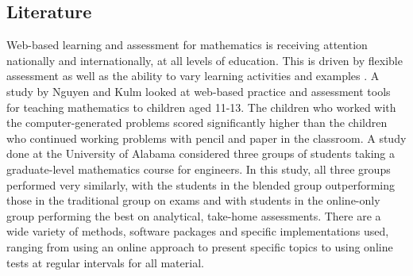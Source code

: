 \documentclass{amsart}
\begin{document}
\subsection{Literature}%
Web-based learning and assessment for mathematics is receiving attention nationally and internationally, at all levels of education.  This is driven by flexible assessment \cite{lh} as well as the ability to vary learning activities and examples \cite{mm}.  A study \cite{nk} by Nguyen and Kulm looked at web-based practice and assessment tools for teaching mathematics to children aged 11-13.  The children who worked with the computer-generated problems scored significantly higher than the children who continued working problems with pencil and paper in the classroom.  A study \cite{kwsc} done at the University of Alabama considered three groups of students taking a graduate-level mathematics course for engineers.  In this study, all three groups performed very similarly, with the students in the blended group outperforming those in the traditional group on exams and with students in the online-only group performing the best on analytical, take-home assessments.  There are a wide variety of methods, software packages and specific implementations used, ranging from using an online approach to present specific topics \cite{mm} to using online tests at regular intervals for all material\cite{gs}.
\end{document}
